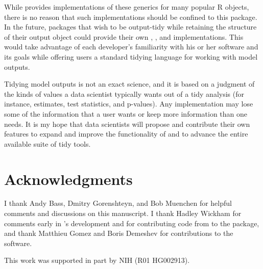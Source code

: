 While  provides implementations of these generics for many popular R objects, there is no reason that such implementations should be confined to this package. In the future, packages that wish to be output-tidy while retaining the structure of their output object could provide their own , , and  implementations. This would take advantage of each developer's familiarity with his or her software and its goals while offering users a standard tidying language for working with model outputs.

Tidying model outputs is not an exact science, and it is based on a judgment of the kinds of values a data scientist typically wants out of a tidy analysis (for instance, estimates, test statistics, and p-values). Any implementation may lose some of the information that a user wants or keep more information than one needs. It is my hope that data scientists will propose and contribute their own features to expand and improve the functionality of  and to advance the entire available suite of tidy tools.

\section{Acknowledgments}

I thank Andy Bass, Dmitry Gorenshteyn, and Bob Muenchen for helpful comments and discussions on this manuscript. I thank Hadley Wickham for comments early in 's development and for contributing code from  to the package, and thank Matthieu Gomez and Boris Demeshev for contributions to the software.

This work was supported in part by NIH (R01 HG002913).



\address{David Robinson\\
  Princeton University\\
  Carl Icahn Laboratory, Washington Road, Princeton, NJ 08544\\
  United States}


